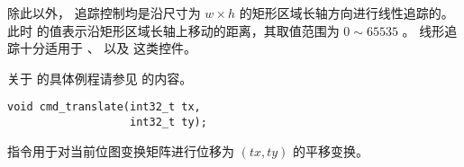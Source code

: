 除此以外， 追踪控制均是沿尺寸为 $w \times h$ 的矩形区域长轴方向进行线性追踪的。
此时  的值表示沿矩形区域长轴上移动的距离，其取值范围为 $0\sim65535$ 。
线形追踪十分适用于  、  以及  这类控件。

关于  的具体例程请参见  的内容。


\begin{framed}
\begin{verbatim}
void cmd_translate(int32_t tx,
                   int32_t ty);
\end{verbatim}
\end{framed}

 指令用于对当前位图变换矩阵进行位移为 $(tx, ty)$ 的平移变换。 
\fsixteen

